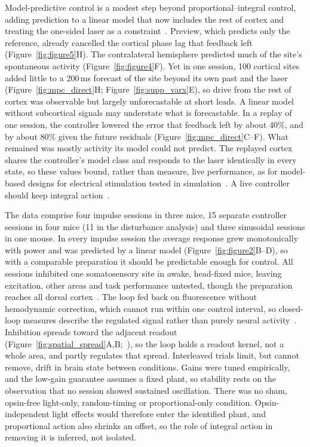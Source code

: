 Model-predictive control is a modest step beyond proportional--integral control, adding prediction to a linear model that now includes the rest of cortex and treating the one-sided laser as a constraint~\citep{mayne2000constrained}.
Preview, which predicts only the reference, already cancelled the cortical phase lag that feedback left (Figure~\ref{fig:figure5}H).
The contralateral hemisphere predicted much of the site's spontaneous activity (Figure~\ref{fig:figure4}F).
Yet in one session, 100 cortical sites added little to a 200\,ms forecast of the site beyond its own past and the laser (Figure~\ref{fig:mpc_direct}H; Figure~\ref{fig:supp_varx}E), so drive from the rest of cortex was observable but largely unforecastable at short leads.
A linear model without subcortical signals may understate what is forecastable.
In a replay of one session, the controller lowered the error that feedback left by about 40\%, and by about 80\% given the future residuals (Figure~\ref{fig:mpc_direct}C--F).
What remained was mostly activity its model could not predict.
The replayed cortex shares the controller's model class and responds to the laser identically in every state, so these values bound, rather than measure, live performance, as for model-based designs for electrical stimulation tested in simulation~\citep{Yang2018,Yang2021}.
A live controller should keep integral action~\citep{pannocchia2003disturbance}.

The data comprise four impulse sessions in three mice, 15 separate controller sessions in four mice (11 in the disturbance analysis) and three sinusoidal sessions in one mouse.
In every impulse session the average response grew monotonically with power and was predicted by a linear model (Figure~\ref{fig:figure2}B--D), so with a comparable preparation it should be predictable enough for control.
All sessions inhibited one somatosensory site in awake, head-fixed mice, leaving excitation, other areas and task performance untested, though the preparation reaches all dorsal cortex~\citep{Matveev2024}.
The loop fed back on fluorescence without hemodynamic correction, which cannot run within one control interval, so closed-loop measures describe the regulated signal rather than purely neural activity~\citep{valley2020separation}.
Inhibition spreads toward the adjacent readout (Figure~\ref{fig:spatial_spread}A,B;~\citealp{li2019spatiotemporal}), so the loop holds a readout kernel, not a whole area, and partly regulates that spread.
Interleaved trials limit, but cannot remove, drift in brain state between conditions.
Gains were tuned empirically, and the low-gain guarantee assumes a fixed plant, so stability rests on the observation that no session showed sustained oscillation.
There was no sham, opsin-free light-only, random-timing or proportional-only condition.
Opsin-independent light effects would therefore enter the identified plant, and proportional action also shrinks an offset, so the role of integral action in removing it is inferred, not isolated.

